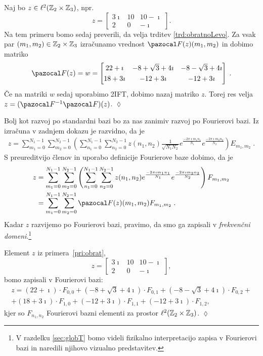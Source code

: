 \begin{primer}\label{pri:obrat}
Naj bo $z \in \ell^2(\mathbb Z_{2} \times \mathbb Z_{3})$, npr.
%
$$z = \begin{bmatrix}
      3\imath & 10 & 10 - \imath\\
      2 & 0 & -\imath
    \end{bmatrix}.$$
%
Na tem primeru bomo sedaj preverili, da velja trditev \ref{trd:obratnoLevo}. Za vsak par $(m_1, m_2) \in \mathbb Z_{2} \times \mathbb Z_{3}$ izračunamo vrednost $\F(z)(m_1, m_2)$ in dobimo matriko
%
$$  \F(z) = w = 
    \begin{bmatrix}
      22+\imath & -8 + \sqrt{3} +4\imath & -8 - \sqrt{3} +4\imath \\[0.1cm]
      18+3\imath & -12 + 3\imath & -12+3\imath
    \end{bmatrix}\;.$$
%
Če na matriki $w$ sedaj uporabimo 2IFT, dobimo nazaj matriko $z$. Torej res velja $z = (\F^{-1}\F)(z)$. \hfill $\lozenge$
\end{primer}
%
Bolj kot razvoj po standardni bazi bo za nas zanimiv razvoj po Fourierovi bazi. Iz izračuna v zadnjem dokazu je razvidno, da je
\begin{align}\label{eq:primerjava}
z = \sum_{m_1 = 0}^{N_1 - 1} \sum_{m_2 = 0}^{N_2 - 1} \left(\sum_{n_1 = 0}^{N_1 - 1} \sum_{n_2 = 0}^{N_2 - 1} z(n_1, n_2) \frac{1}{\sqrt{N_1N_2}} e^{\frac{-2\pi \imath m_1n_1}{N_1}} e^{\frac{-2\pi \imath m_2n_2}{N_2}}\right) E_{m_1, m_2} \;.
\end{align}
%
S preureditvijo členov in uporabo definicije Fourierove baze dobimo, da je
\begin{align*}
z & = \sum_{m_1 = 0}^{N_1 - 1} \sum_{m_2 = 0}^{N_2 - 1} \left(\sum_{n_1 = 0}^{N_1 - 1} \sum_{n_2 = 0}^{N_2 - 1} z(n_1, n_2) e^{\frac{-2\pi \imath m_1n_1}{N_1}} e^{\frac{-2\pi \imath m_2n_2}{N_2}}\right) F_{m_1,m_2} \\
& = \sum_{m_1 = 0}^{N_1 - 1} \sum_{m_2 = 0}^{N_2 - 1} \F(z)(m_1, m_2) F_{m_1, m_2}\;.
\end{align*}
%
Kadar $z$ razvijemo po Fourierovi bazi, pravimo, da smo ga zapisali v \emph{frekvenčni domeni}.\footnote{V razdelku \ref{sec:globT} bomo videli fizikalno interpretacijo zapisa v Fourierovi bazi in naredili njihovo vizualno predstavitev.}
%
\begin{primer}
Element $z$ iz primera~\ref{pri:obrat},
%
$$z = \begin{bmatrix}
      3\imath & 10 & 10 - \imath\\
      2 & 0 & -\imath
    \end{bmatrix},$$
%
bomo zapisali v Fourierovi bazi:
\begin{multline*}
z = (22+\imath) \cdot F_{0,0} + (-8 + \sqrt{3} +4\imath) \cdot F_{0,1} + (-8 - \sqrt{3} +4\imath) \cdot F_{0,2} + \\
+ (18+3\imath) \cdot F_{1,0} + (-12 + 3\imath) \cdot F_{1,1}+ (-12+3\imath) \cdot F_{1,2},
\end{multline*}
kjer so $F_{n_1, n_2}$ Fourierovi bazni elementi za prostor $\ell^2(\mathbb Z_2 \times \mathbb Z_3)$.
\hfill $\lozenge$
\end{primer}
